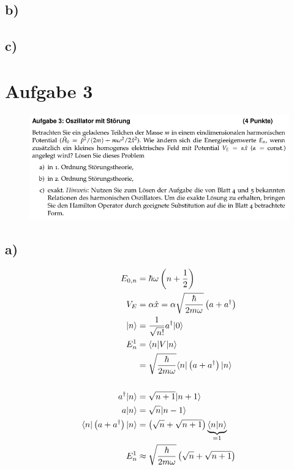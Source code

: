 \subsection{b)}

\subsection{c)}

\section{Aufgabe 3}

    \begin{figure}[H]
        \centering
        \includegraphics[width=\textwidth]{images/Aufgabe3.jpg}
        \label{fig:4}
    \end{figure}

\subsection{a)}

    \begin{align*}
        E_{0,n} &= \hbar\omega \left( n+\frac{1}{2} \right)\\
        V_E &= \alpha \hat{x} = \alpha \sqrt{\frac{\hbar}{2m\omega}} \left( a+a^{\dagger} \right)\\
        \lvert n\rangle &= \frac{1}{\sqrt{n!}} a^{\dagger} \lvert0\rangle\\
        E_n^1 &= \langle n\rvert V\lvert n\rangle\\
        &= \sqrt{\frac{\hbar}{2m\omega}} \langle n\rvert \left( a+a^{\dagger} \right) \lvert n\rangle \\
        \\
        a^{\dagger} \lvert n\rangle &= \sqrt{n+1} \lvert n+1\rangle\\
        a \lvert n\rangle &= \sqrt{n} \lvert n-1\rangle\\
        \langle n\rvert \left( a+a^{\dagger} \right) \lvert n\rangle &= \left( \sqrt{n} + \sqrt{n+1} \right) \underbrace{\braket{n}{n}}_{=1}\\
        E_n^1 &\approx \sqrt{\frac{\hbar}{2m\omega}} \left( \sqrt{n} + \sqrt{n+1} \right)
    \end{align*}

